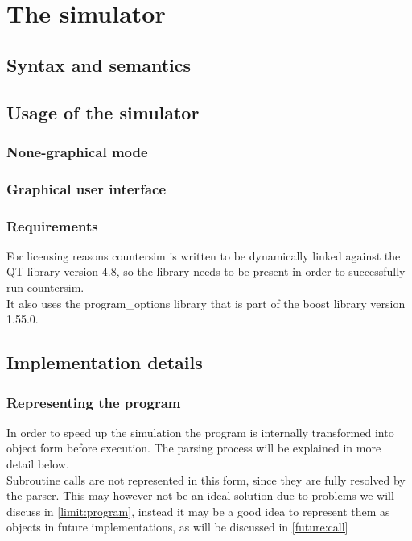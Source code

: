 \chapter{The simulator}
\label{chap:simulator}
\section{Syntax and semantics}
\section{Usage of the simulator}
\subsection{None-graphical mode}
\subsection{Graphical user interface}
\subsection{Requirements}
For licensing reasons countersim is written to be dynamically linked against the QT library version 4.8, so the library needs to be present in order to successfully run countersim.\\
It also uses the program\_options library that is part of the boost library version 1.55.0.
\section{Implementation details}
\subsection{Representing the program}
In order to speed up the simulation the program is internally transformed into object form before execution. The parsing process will be explained in more detail below.\\
Subroutine calls are not represented in this form, since they are fully resolved by the parser. This may however not be an ideal solution due to problems we will discuss in \autoref{limit:program}, instead it may be a good idea to represent them as objects in future implementations, as will be discussed in \autoref{future:call}

